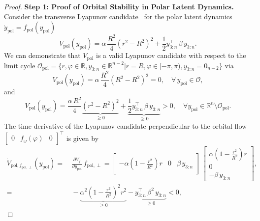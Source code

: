 \begin{proof}
    \textbf{Step 1: Proof of Orbital Stability in Polar Latent Dynamics.}
    Consider the transverse Lyapunov candidate~\citep{manchester2011transverse} for the polar latent dynamics $\dot{y}_\mathrm{pol} = f_\mathrm{pol}(y_\mathrm{pol})$
    \begin{equation}
        V_\mathrm{pol}(y_\mathrm{pol}) = \alpha \, \frac{R^2}{4} \left ( r^2 - R^2 \right )^2 + \frac{1}{2} y_{3:n}^\top \, \beta \, y_{3:n}.
    \end{equation}
    We can demonstrate that $V_\mathrm{pol}$ is a valid Lyapunov candidate with respect to the limit cycle $\mathcal{O}_\mathrm{pol} = \{ r, \varphi \in \mathbb{R}, y_{3:n} \in \mathbb{R}^{n-2} | r = R, \varphi \in [-\pi, \pi), y_{3:n} = 0_{n-2} \}$ via
    \begin{equation}
        V_\mathrm{pol}(y_{\mathrm{pol}}) = \alpha \, \frac{R^2}{4} \left ( R^2 - R^2 \right )^2 = 0,
        \quad
        \forall \, y_{\mathrm{pol}} \in \mathcal{O},
    \end{equation}
    and
    \begin{equation}
        V_\mathrm{pol}(y_{\mathrm{pol}}) = \frac{\alpha \, R^2}{4} \underbrace{\left ( r^2 - R^2 \right )^2}_{\geq 0} + \underbrace{\frac{1}{2} y_{3:n}^\top \, \beta \, y_{3:n}}_{\geq 0} > 0,
        \quad
        \forall y_{\mathrm{pol}} \in \mathbb{R}^{n} \setminus \mathcal{O}_\mathrm{pol}.
    \end{equation}
    The time derivative of the Lyapunov candidate perpendicular to the orbital flow $\begin{bmatrix}
        0 & f_\omega(\varphi) & 0
    \end{bmatrix}^\top$ is given by
    \begin{equation}
    \begin{split}
         \dot{V}_{\mathrm{pol},f_{\mathrm{pol},\perp}}(y_\mathrm{pol}) =& \: \frac{\partial V_\mathrm{y}}{\partial y_\mathrm{pol}} \, f_{\mathrm{pol},\perp} = \begin{bmatrix}
            -\alpha \left ( 1-\frac{r^2}{R^2} \right ) r & 0 & \beta \, y_{3:n}
        \end{bmatrix} \, \begin{bmatrix}
            \alpha \left ( 1-\frac{r^2}{R^2} \right ) r\\
            0\\
            -\beta \, y_{3:n}
        \end{bmatrix},\\
        =& \: -\underbrace{\alpha^2 \left (1 - \frac{r^2}{R^2} \right )^2 r^2}_{\geq 0} - \underbrace{y_{3:n}^\top \, \beta^2 \, y_{3:n}}_{\geq 0} < 0,

\end{split}
\end{equation}
\end{proof}
